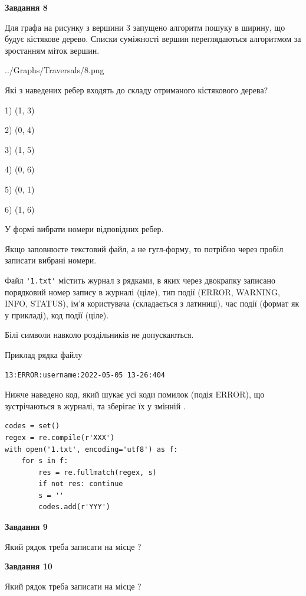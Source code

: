 \documentclass[12pt, ukrainian]{article}
\def\code#1{\Verb!#1!}
\begin{document}
{\begin {large}
{\begin {center}\textbf{Завдання 8}\end {center}}\par
Для графа на рисунку з вершини 3 запущено алгоритм пошуку в ширину, що будує кістякове дерево. Списки суміжності вершин переглядаються алгоритмом за зростанням міток вершин.\par
\begin{center}
	{../Graphs/Traversals/8.png}
\end{center}
\par Які з наведених ребер входять до складу отриманого кістякового дерева?\par
1) (1, 3)\par
2) (0, 4)\par
3) (1, 5)\par
4) (0, 6)\par
5) (0, 1)\par
6) (1, 6)\par
{\vskip 15pt} У формі вибрати номери відповідних ребер.


Якщо заповнюєте текстовий файл, а не гугл-форму, то потрібно через пробіл записа\-ти вибрані номери.\par
\newpage


Файл \code{'1.txt'} містить журнал з рядками, в яких через двокрапку записано поряд\-ко\-вий номер запису в журналі (ціле), тип події (ERROR, WARNING, INFO, STATUS), ім'я користувача (складається з латиниці), час події (фор\-мат як у прикладі), код події (ціле).

Білі символи навколо роздільників не допускаються.

Приклад рядка файлу



\begin{verbatim}
13:ERROR:username:2022-05-05 13-26:404
\end{verbatim}


Нижче наведено код, який шукає усі коди помилок (подія ERROR), що зустріча\-ють\-ся в журналі, та зберігає їх у змінній .



\begin{verbatim}
codes = set()
regex = re.compile(r'XXX')
with open('1.txt', encoding='utf8') as f:
    for s in f:
        res = re.fullmatch(regex, s)
        if not res: continue
        s = ''
        codes.add(r'YYY')
\end{verbatim}


{\begin {center}\textbf{Завдання 9}\end {center}}\par
Який рядок треба записати на місце  ?\par
\vspace{5mm}


{\begin {center}\textbf{Завдання 10}\end {center}}\par
Який рядок треба записати на місце  ?\par


\newpage


\end {large}}
\end{document}
